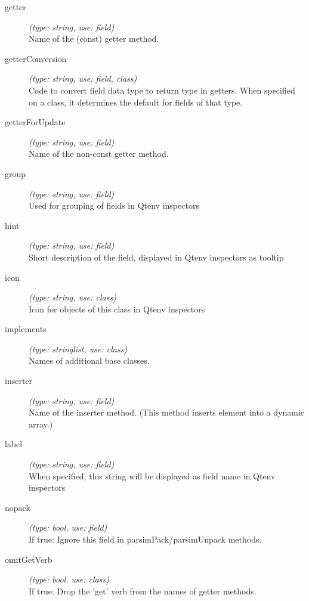 \begin{description}
\item[getter] \textit{(type: string, use: field)} \\
    Name of the (const) getter method.

\item[getterConversion] \textit{(type: string, use: field, class)} \\
    Code to convert field data type to return type in getters. When specified on
    a class, it determines the default for fields of that type.

\item[getterForUpdate] \textit{(type: string, use: field)} \\
    Name of the non-const getter method.

\item[group] \textit{(type: string, use: field)} \\
    Used for grouping of fields in Qtenv inspectors

\item[hint] \textit{(type: string, use: field)} \\
    Short description of the field, displayed in Qtenv inspectors as tooltip

\item[icon] \textit{(type: string, use: class)} \\
    Icon for objects of this class in Qtenv inspectors

\item[implements] \textit{(type: stringlist, use: class)} \\
    Names of additional base classes.

\item[inserter] \textit{(type: string, use: field)} \\
    Name of the inserter method. (This method inserts element into a dynamic
    array.)

\item[label] \textit{(type: string, use: field)} \\
    When specified, this string will be displayed as field name in Qtenv
    inspectors

\item[nopack] \textit{(type: bool, use: field)} \\
    If true: Ignore this field in parsimPack/parsimUnpack methods.

\item[omitGetVerb] \textit{(type: bool, use: class)} \\
    If true: Drop the 'get' verb from the names of getter methods.


\end{description}
